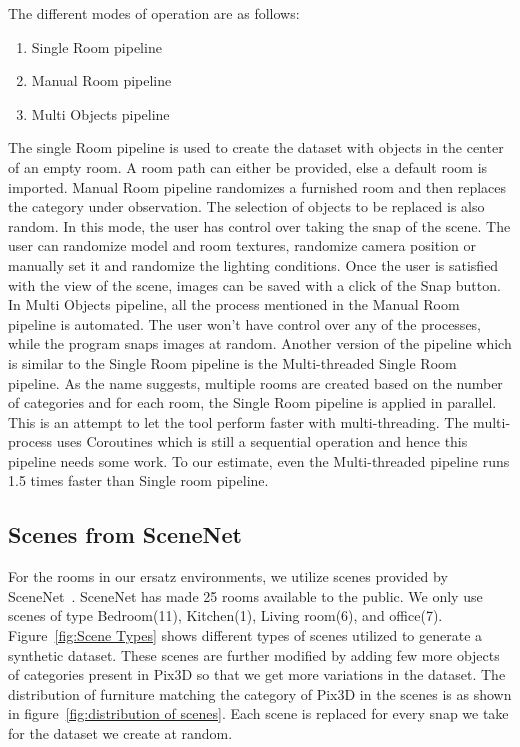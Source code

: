 The different modes of operation are as follows:
\begin{enumerate}
\item Single Room pipeline
\item Manual Room pipeline
\item Multi Objects pipeline
\end{enumerate}

The single Room pipeline is used to create the dataset with objects in the center of an empty room.
A room path can either be provided, else a default room is imported.
Manual Room pipeline randomizes a furnished room and then replaces the category under observation.
The selection of objects to be replaced is also random.
In this mode, the user has control over taking the snap of the scene.
The user can randomize model and room textures, randomize camera position or manually set it and randomize the lighting conditions.
Once the user is satisfied with the view of the scene, images can be saved with a click of the Snap button.
In Multi Objects pipeline, all the process mentioned in the Manual Room pipeline is automated.
The user won’t have control over any of the processes, while the program snaps images at random.
Another version of the pipeline which is similar to the Single Room pipeline is the Multi-threaded Single Room pipeline.
As the name suggests, multiple rooms are created based on the number of categories and for each room, the Single Room pipeline is applied in parallel.
This is an attempt to let the tool perform faster with multi-threading.
The multi-process uses Coroutines which is still a sequential operation and hence this pipeline needs some work.
To our estimate, even the Multi-threaded pipeline runs 1.5 times faster than Single room pipeline.

\subsection{Scenes from SceneNet}\label{subsec:scenes-from-scenenet}
For the rooms in our ersatz environments, we utilize scenes provided by SceneNet~\cite{McCormac:etal:ICCV2017}.
SceneNet has made 25 rooms available to the public.
We only use scenes of type Bedroom(11), Kitchen(1), Living room(6), and office(7).
Figure~\ref{fig:Scene Types} shows different types of scenes utilized to generate a synthetic dataset.
These scenes are further modified by adding few more objects of categories present in Pix3D so that we get more variations in the dataset.
The distribution of furniture matching the category of Pix3D in the scenes is as shown in figure~\ref{fig:distribution of scenes}.
Each scene is replaced for every snap we take for the dataset we create at random.

